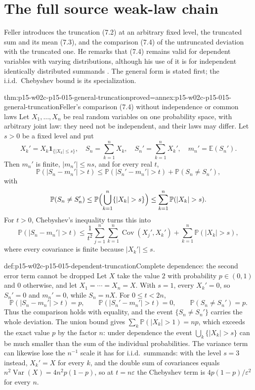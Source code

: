 \section{The full source weak-law chain}
\label{sec:p15-feller-generalized-weak-law}

Feller introduces the truncation (7.2) at an arbitrary fixed level,
the truncated sum and its mean (7.3), and the comparison (7.4) of the
untruncated deviation with the truncated one. He remarks that (7.4)
remains valid for dependent variables with varying distributions,
although his use of it is for independent identically distributed
summands \cite[VII.7, pp.~234--235]{Feller1971ProbabilityII}. The
general form is stated first; the i.i.d.\ Chebyshev bound is its
specialization.

\begin{hblemma}{thm:p15-w02c-p15-015-general-truncation}{proved=annex:p15-w02c-p15-015-general-truncation}{Feller's comparison (7.4) without independence or common laws}
Let \(X_1,\ldots,X_n\) be real random variables on one probability
space, with arbitrary joint law: they need not be independent, and
their laws may differ. Let \(s>0\) be a fixed level and put
\[
 X_k'=X_k\mathbf1_{\{|X_k|\leq s\}},\quad
 S_n=\sum_{k=1}^nX_k,\quad S_n'=\sum_{k=1}^nX_k',\quad
 m_n'=\mathbb E(S_n').
\]
Then \(m_n'\) is finite, \(|m_n'|\leq ns\), and for every real \(t\),
\[
 \mathbb P(|S_n-m_n'|>t)\leq\mathbb P(|S_n'-m_n'|>t)
                       +\mathbb P(S_n\ne S_n'),
\]
with
\[
 \mathbb P(S_n\ne S_n')\leq\mathbb P\Bigl(\bigcup_{k=1}^n\{|X_k|>s\}\Bigr)
                     \leq\sum_{k=1}^n\mathbb P(|X_k|>s).
\]
For \(t>0\), Chebyshev's inequality turns this into
\[
 \mathbb P(|S_n-m_n'|>t)\leq
 \frac{1}{t^2}\sum_{j=1}^n\sum_{k=1}^n
       \operatorname{Cov}(X_j',X_k')
 +\sum_{k=1}^n\mathbb P(|X_k|>s),
\]
where every covariance is finite because \(|X_k'|\leq s\).
\end{hblemma}

\begin{hbexample}{def:p15-w02c-p15-015-dependent-truncation}{Complete dependence: the second error term cannot be dropped}
Let \(X\) take the value \(2\) with probability \(p\in(0,1)\) and
\(0\) otherwise, and let \(X_1=\cdots=X_n=X\). With \(s=1\), every
\(X_k'=0\), so \(S_n'=0\) and \(m_n'=0\), while \(S_n=nX\). For
\(0\leq t<2n\),
\[
 \mathbb P(|S_n-m_n'|>t)=p,\qquad
 \mathbb P(|S_n'-m_n'|>t)=0,\qquad
 \mathbb P(S_n\ne S_n')=p.
\]
Thus the comparison holds with equality, and the event
\(\{S_n\ne S_n'\}\) carries the whole deviation. The union bound gives
\(\sum_k\mathbb P(|X_k|>1)=np\), which exceeds the exact value \(p\) by
the factor \(n\): under dependence the event
\(\bigcup_k\{|X_k|>s\}\) can be much smaller than the sum of the
individual probabilities. The variance term can likewise lose the
\(n^{-1}\) scale it has for i.i.d.\ summands: with the level \(s=3\)
instead, \(X_k'=X\) for every \(k\), and the double sum of covariances
equals \(n^2\operatorname{Var}(X)=4n^2p(1-p)\), so at \(t=n\varepsilon\)
the Chebyshev term is \(4p(1-p)/\varepsilon^2\) for every \(n\).
\end{hbexample}

